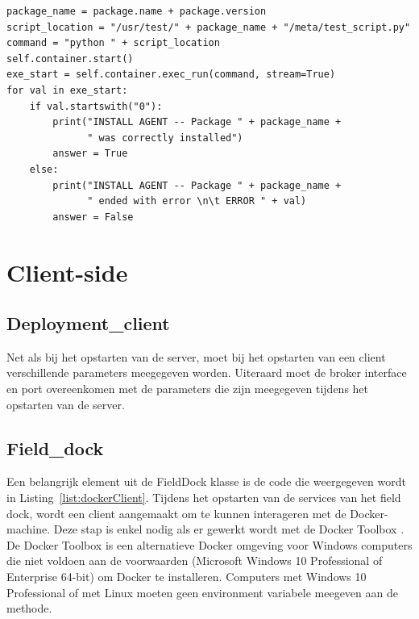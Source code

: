 \begin{minipage}{\linewidth}
\begin{center}
\begin{lstlisting}[captionpos=b,caption={Controle van een pakket},label={list:checkPackage}]
package_name = package.name + package.version
script_location = "/usr/test/" + package_name + "/meta/test_script.py"
command = "python " + script_location
self.container.start()
exe_start = self.container.exec_run(command, stream=True)
for val in exe_start:
    if val.startswith("0"):
        print("INSTALL AGENT -- Package " + package_name +
              " was correctly installed")
        answer = True
    else:
        print("INSTALL AGENT -- Package " + package_name +
              " ended with error \n\t ERROR " + val)
        answer = False
\end{lstlisting}
\end{center}
\end{minipage}

\section{Client-side}
\subsection{Deployment\_client}
Net als bij het opstarten van de server, moet bij het opstarten van een client verschillende parameters meegegeven worden.
Uiteraard moet de broker interface en port overeenkomen met de parameters die zijn meegegeven tijdens het opstarten van de server.


\subsection{Field\_dock}
Een belangrijk element uit de FieldDock klasse is de code die weergegeven wordt in Listing~\ref{list:dockerClient}.
Tijdens het opstarten van de services van het field dock, wordt een client aangemaakt om te kunnen interageren met de Docker-machine.
Deze stap is enkel nodig als er gewerkt wordt met de Docker Toolbox \citep{dockertoolbox}.
De Docker Toolbox is een alternatieve Docker omgeving voor Windows computers die niet voldoen aan de voorwaarden (Microsoft Windows 10 Professional of Enterprise 64-bit) om Docker te installeren.
Computers met Windows 10 Professional of met Linux moeten geen environment variabele meegeven aan de methode.

